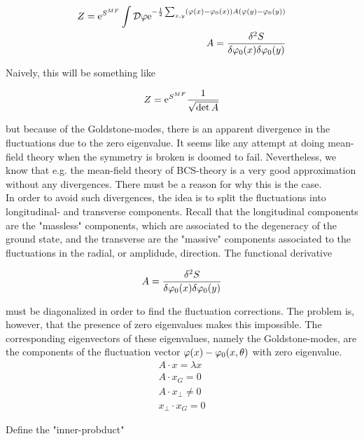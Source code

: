 \begin{align*}
    Z = \e^{S^{MF}}\int \D \p \e^{-\frac{1}{2}\sum_{x,y} (\p(x) - \p_0(x)) A (\p(y) - \p_0(y))} \\
    A = \fdv{^2S}{\p_0(x) \delta \p_0(y)}
\end{align*}

Naively, this will be something like 

\begin{align*}
    Z = \mathrm{e}^{S^{MF}} \frac{1}{\sqrt{\det A}}
\end{align*}

but because of the Goldstone-modes, there is an apparent divergence in the fluctuations due to the zero eigenvalue. It seems like any attempt at doing mean-field theory when the symmetry is broken is doomed to fail. Nevertheless, we know that e.g. the mean-field theory of BCS-theory is a very good approximation without any divergences. There must be a reason for why this is the case. \\ 

In order to avoid such divergences, the idea is to split the fluctuations into longitudinal- and transverse components. Recall that the longitudinal components are the "massless" components, which are associated to the degeneracy of the ground state, and the transverse are the "massive" components associated to the fluctuations in the radial, or amplidude, direction. The functional derivative 

\begin{equation*}
    A = \fdv{^2S}{\p_0(x) \delta \p_0(y)}
\end{equation*}

must be diagonalized in order to find the fluctuation corrections. The problem is, however, that the presence of zero eigenvalues makes this impossible. The corresponding eigenvectors of these eigenvalues, namely the Goldstone-modes, are the components of the fluctuation vector $\varphi(x) - \varphi_0(x,\theta)$ with zero eigenvalue. \\ 

\begin{align*}
    A \cdot x = \lambda x \\ 
    A \cdot x_G = 0 \\ 
    A \cdot x_{\perp} \neq 0 \\ 
    x_{\perp} \cdot x_G = 0
\end{align*}

Define the "inner-probduct" \\

